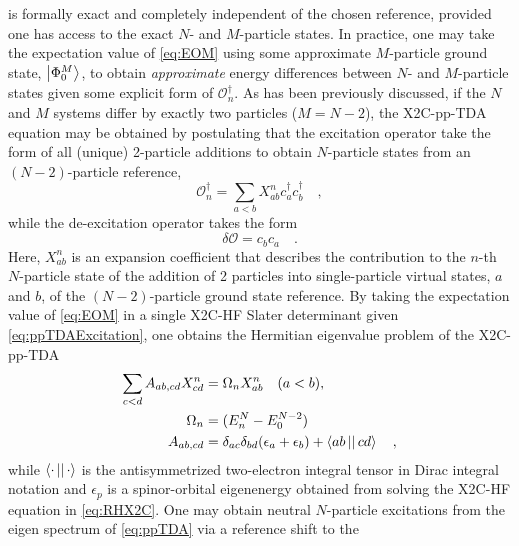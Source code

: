  is formally exact and completely independent of the chosen reference, provided one has access to the exact $N$- and $M$-particle states.
In practice, one may take the expectation value of \cref{eq:EOM} using some approximate $M$-particle ground state, $\left\vert \Phi_0^M \right\rangle$, to obtain \emph{approximate} energy differences between $N$- and $M$-particle states given some explicit form of $\mathcal{O}^\dagger_n$.
As has been previously discussed, if the $N$ and $M$ systems differ by exactly two particles ($M=N- 2$), the X2C-pp-TDA equation may be obtained by
postulating that the excitation operator take the form of all (unique) 2-particle additions to obtain $N$-particle states from an $(N-2)$-particle reference,
\begin{equation}
 \mathcal{O}_n^\dagger = \sum_{a < b} X^n_{ab} c_a^\dagger c_b^\dagger \quad, \label{eq:ppTDAExcitation}
\end{equation}
while the de-excitation operator takes the form
\begin{equation}
 \delta\mathcal{O} = c_b c_a \quad.
\end{equation}
Here, $X^n_{ab}$ is an expansion coefficient that describes the contribution to the $n$-th $N$-particle state of the addition of 2 particles into single-particle virtual states, $a$ and $b$, of the $(N-2)$-particle ground state reference. By taking the expectation value of \cref{eq:EOM} in a single X2C-HF Slater determinant
given \cref{eq:ppTDAExcitation}, one obtains the Hermitian eigenvalue problem of the X2C-pp-TDA
\begin{align}
\sum_{c < d} A_{ab,cd} X^n_{cd} &= \Omega_n X^n_{ab} \quad (a < b), \label{eq:ppTDA}\\
\Omega_n &= (E_n^N - E_0^{N-2}) \\
A_{ab,cd} &= \delta_{ac}\delta_{bd} (\epsilon_a + \epsilon_b) + \left\langle ab \left\vert  \right\vert cd \right\rangle \quad \label{eq:AMat},
\end{align}
while $\left\langle \cdot \left\vert  \right\vert \cdot \right\rangle$ is the antisymmetrized two-electron integral tensor in Dirac integral notation and $\epsilon_p$ is a spinor-orbital
eigenenergy obtained from solving the X2C-HF equation in \cref{eq:RHX2C}. One may obtain neutral $N$-particle excitations from the eigen spectrum of \cref{eq:ppTDA} via a reference shift to the
